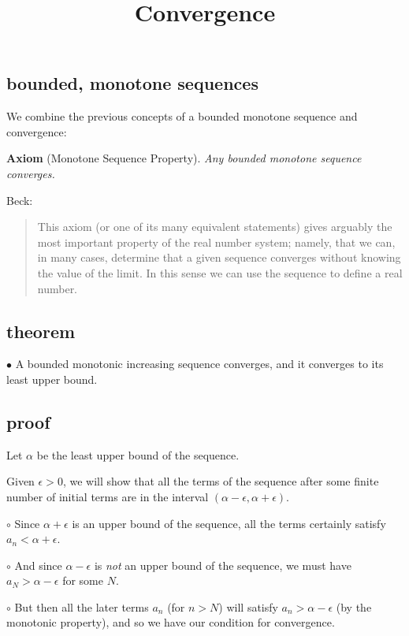 \documentclass[11pt, oneside]{article}
\title{Convergence}
\date{}
\begin{document}
\maketitle
\Large

\subsection*{bounded, monotone sequences}

We combine the previous concepts of a bounded monotone sequence and convergence:

\textbf{Axiom}  (Monotone Sequence Property). \emph{Any bounded monotone sequence converges.}

Beck:
\begin{quote}This axiom (or one of its many equivalent statements) gives arguably the most important property of the real number system; namely, that we can, in many cases, determine that a given sequence converges without knowing the value of the limit. In this sense we can use the sequence to define a real number.\end{quote}


\subsection*{theorem}

$\bullet$  A bounded monotonic increasing sequence converges, and it converges to its least upper bound.

\subsection*{proof}

Let $\alpha$ be the least upper bound of the sequence.

Given $\epsilon > 0$, we will show that all the terms of the sequence after some finite number of initial terms are in the interval $(\alpha - \epsilon, \alpha + \epsilon)$.

$\circ$  Since $\alpha + \epsilon$ is an upper bound of the sequence, all the terms certainly satisfy $a_n < \alpha + \epsilon$.

$\circ$  And since $\alpha - \epsilon$ is \emph{not} an upper bound of the sequence, we must have $a_N > \alpha - \epsilon$ for some $N$.

$\circ$  But then all the later terms $a_n$ (for $n > N$)  will satisfy $a_n > \alpha - \epsilon$ (by the monotonic property), and so we have our condition for convergence.
\end{document}
